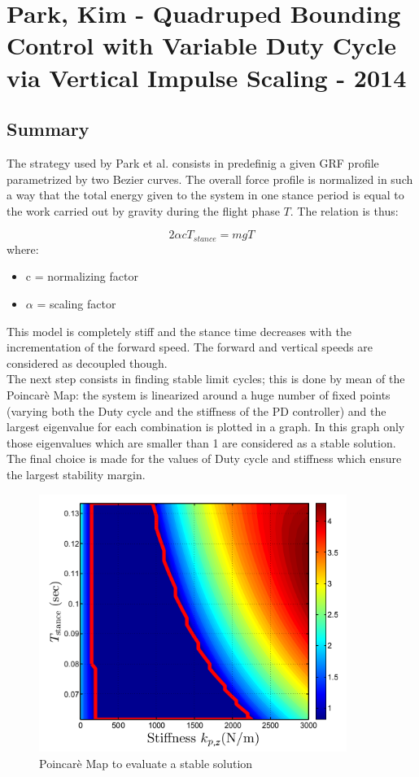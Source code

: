 \section{Park, Kim - Quadruped Bounding Control with Variable Duty Cycle via Vertical Impulse Scaling - 2014}


\subsection*{Summary}
The strategy used by Park et al. consists in predefinig a given GRF profile parametrized by two Bezier curves. The overall force profile is normalized in such a way that the total energy given to the system in one stance period is equal to the work carried out by gravity during the flight phase $T$.
The relation is thus:

\begin{equation}
2 \alpha c T_{stance} = m g T
\end{equation}
where:
\begin{itemize}
\item c = normalizing factor
\item $\alpha$ = scaling factor
\end{itemize}
This model is completely stiff and the stance time decreases with the incrementation of the forward speed. The forward and vertical speeds are considered as decoupled though.\\
The next step consists in finding stable limit cycles; this is done by mean of the Poincarè Map: the system is linearized around a huge number of fixed points (varying both the Duty cycle and the stiffness of the PD controller) and the largest eigenvalue for each combination is plotted in a graph. In this graph only those eigenvalues which are smaller than 1 are considered as a stable solution. The final choice is made for the values of Duty cycle and stiffness which ensure the largest stability margin.
\begin{figure}[h]
  \centering
  \includegraphics[width=100mm]{PoincarèMap.png}
  \caption{Poincarè Map to evaluate a stable solution}
  \label{InftyCap}
\end{figure}

